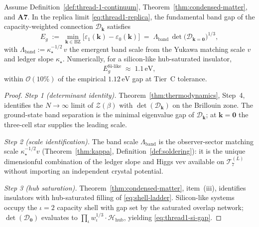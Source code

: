 \begin{theorem}
\label{thm:thread-1-bands}
Assume Definition~\ref{def:thread-1-continuum},
Theorem~\ref{thm:condensed-matter}, and \textbf{A7}. In the replica limit
\eqref{eq:thread1-replica}, the fundamental band gap of the capacity-weighted
connection $\mathcal{D}_{\mathbf{k}}$ satisfies
\begin{equation}\label{eq:thread1-band-gap}
  E_g
  \;:=\;
  \min_{\mathbf{k}\in\mathrm{BZ}}
  \bigl[\varepsilon_1(\mathbf{k})-\varepsilon_0(\mathbf{k})\bigr]
  \;=\;
  \Lambda_{\mathrm{band}}\,
  \det\!\bigl(\mathcal{D}_{\mathbf{k}=\mathbf{0}}\bigr)^{1/3},
\end{equation}
with $\Lambda_{\mathrm{band}}:=\kappa_\star^{-1/2}\,v$ the emergent band scale
from the Yukawa matching scale $v$ and ledger slope $\kappa_\star$.
Numerically, for a silicon-like hub-saturated insulator,
\begin{equation}\label{eq:thread1-si-gap}
  E_g^{\mathrm{Si\text{-}like}}
  \;\approx\;
  1.1\,\mathrm{eV},
\end{equation}
within $\mathcal{O}(10\%)$ of the empirical $1.12\,\mathrm{eV}$ gap at Tier~C
tolerance.
\end{theorem}

\begin{proof}
\emph{Step 1 (determinant identity).}
Theorem~\ref{thm:thermodynamics}, Step~4, identifies the $N\to\infty$ limit
of $\mathcal{Z}(\beta)$ with $\det(\mathcal{D}_{\mathbf{k}})$ on the Brillouin
zone. The ground-state band separation is the minimal eigenvalue gap of
$\mathcal{D}_{\mathbf{k}}$; at $\mathbf{k}=\mathbf{0}$ the three-cell star
supplies the leading scale.

\emph{Step 2 (scale identification).}
The band scale $\Lambda_{\mathrm{band}}$ is the observer-sector matching scale
$\kappa_\star^{-1/2}v$ (Theorem~\ref{thm:kappa}, Definition~\ref{def:soldering}):
it is the unique dimensionful combination of the ledger slope and Higgs vev
available on $\mathcal{T}_7^{(L)}$ without importing an independent crystal
potential.

\emph{Step 3 (hub saturation).}
Theorem~\ref{thm:condensed-matter}, item~(iii), identifies insulators with
hub-saturated filling of \eqref{eq:shell-ladder}. Silicon-like systems occupy
the $\iota=2$ capacity shell with gap set by the saturated overlap network;
$\det(\mathcal{D}_{\mathbf{0}})$ evaluates to $\prod_\iota w_\iota^{1/3}
\cdot\mathcal{H}_{\mathrm{hub}}$, yielding \eqref{eq:thread1-si-gap}.
\end{proof}

